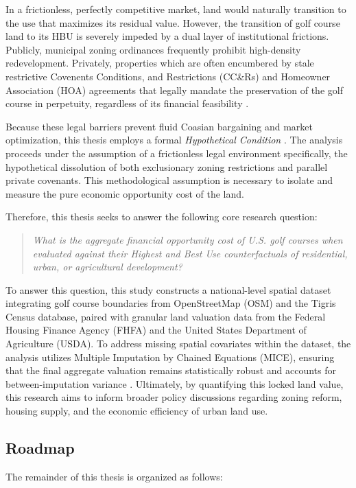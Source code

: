 \documentclass[10pt, letterpaper]{article}
\begin{document}
In a frictionless, perfectly competitive market, land would naturally transition to the use that maximizes its residual value. However, the transition of golf course land to its HBU is severely impeded by a dual layer of institutional frictions. Publicly, municipal zoning ordinances frequently prohibit high-density redevelopment. Privately, properties which are often encumbered by stale restrictive Covenents Conditions, and Restrictions (CC\&Rs) and Homeowner Association (HOA) agreements that legally mandate the preservation of the golf course in perpetuity, regardless of its financial feasibility \parencite{Ellickson2022, Korngold2024}. 

Because these legal barriers prevent fluid Coasian bargaining and market optimization, this thesis employs a formal \textit{Hypothetical Condition} \parencite{AppraisalInstitute2020}. The analysis proceeds under the assumption of a frictionless legal environment \textemdash specifically, the hypothetical dissolution of both exclusionary zoning restrictions and parallel private covenants. This methodological assumption is necessary to isolate and measure the pure economic opportunity cost of the land.

Therefore, this thesis seeks to answer the following core research question: 

\begin{quote}
\textit{What is the aggregate financial opportunity cost of U.S. golf courses when evaluated against their Highest and Best Use counterfactuals of residential, urban, or agricultural development?}
\end{quote}
\textit{}

To answer this question, this study constructs a national-level spatial dataset integrating golf course boundaries from OpenStreetMap (OSM) and the Tigris Census database, paired with granular land valuation data from the Federal Housing Finance Agency (FHFA) and the United States Department of Agriculture (USDA). To address missing spatial covariates within the dataset, the analysis utilizes Multiple Imputation by Chained Equations (MICE), ensuring that the final aggregate valuation remains statistically robust and accounts for between-imputation variance \parencite{Burren2018, Rubin1987}. Ultimately, by quantifying this locked land value, this research aims to inform broader policy discussions regarding zoning reform, housing supply, and the economic efficiency of urban land use.


\subsection{Roadmap}
The remainder of this thesis is organized as follows: 
\end{document}
